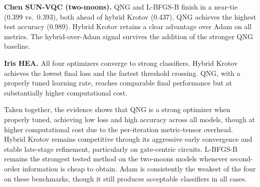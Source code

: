 \documentclass[11pt]{article}
\begin{document}
\textbf{Chen SUN-VQC (two-moons).} QNG and L-BFGS-B finish in a near-tie (0.399 vs.\ 0.393), both ahead of hybrid Krotov (0.437). QNG achieves the highest test accuracy (0.989). Hybrid Krotov retains a clear advantage over Adam on all metrics. The hybrid-over-Adam signal survives the addition of the stronger QNG baseline.

\textbf{Iris HEA.} All four optimizers converge to strong classifiers. Hybrid Krotov achieves the lowest final loss and the fastest threshold crossing. QNG, with a properly tuned learning rate, reaches comparable final performance but at substantially higher computational cost.

Taken together, the evidence shows that QNG is a strong optimizer when properly tuned, achieving low loss and high accuracy across all models, though at higher computational cost due to the per-iteration metric-tensor overhead. Hybrid Krotov remains competitive through its aggressive early convergence and stable late-stage refinement, particularly on gate-centric circuits. L-BFGS-B remains the strongest tested method on the two-moons models whenever second-order information is cheap to obtain. Adam is consistently the weakest of the four on these benchmarks, though it still produces acceptable classifiers in all cases.
\end{document}
